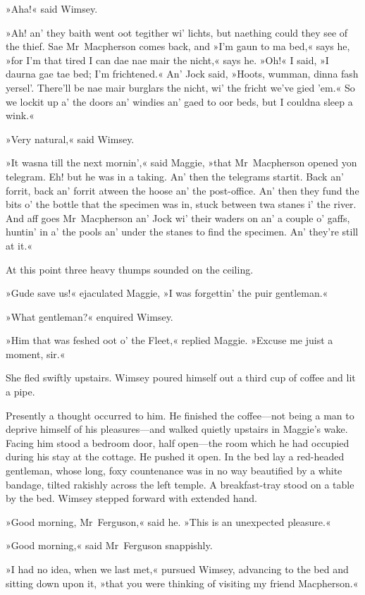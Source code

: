 »Aha!« said Wimsey.

»Ah! an' they baith went oot tegither wi' lichts, but naething could they see of the thief. Sae Mr~Macpherson comes back, and »I'm gaun to ma bed,« says he, »for I'm that tired I can dae nae mair the nicht,« says he. »Oh!« I said, »I daurna gae tae bed; I'm frichtened.« An' Jock said, »Hoots, wumman, dinna fash yersel'. There'll be nae mair burglars the nicht, wi' the fricht we've gied 'em.« So we lockit up a' the doors an' windies an' gaed to oor beds, but I couldna sleep a wink.«

»Very natural,« said Wimsey.

»It wasna till the next mornin',« said Maggie, »that Mr~Macpherson opened yon telegram. Eh! but he was in a taking. An' then the telegrams startit. Back an' forrit, back an' forrit atween the hoose an' the post-office. An' then they fund the bits o' the bottle that the specimen was in, stuck between twa stanes i' the river. And aff goes Mr~Macpherson an' Jock wi' their waders on an' a couple o' gaffs, huntin' in a' the pools an' under the stanes to find the specimen. An' they're still at it.«

At this point three heavy thumps sounded on the ceiling.

»Gude save us!« ejaculated Maggie, »I was forgettin' the puir gentleman.«

»What gentleman?« enquired Wimsey.

»Him that was feshed oot o' the Fleet,« replied Maggie. »Excuse me juist a moment, sir.«

She fled swiftly upstairs. Wimsey poured himself out a third cup of coffee and lit a pipe.

Presently a thought occurred to him. He finished the coffee—not being a man to deprive himself of his pleasures—and walked quietly upstairs in Maggie's wake. Facing him stood a bedroom door, half open—the room which he had occupied during his stay at the cottage. He pushed it open. In the bed lay a red-headed gentleman, whose long, foxy countenance was in no way beautified by a white bandage, tilted rakishly across the left temple. A breakfast-tray stood on a table by the bed. Wimsey stepped forward with extended hand.

»Good morning, Mr~Ferguson,« said he. »This is an unexpected pleasure.«

»Good morning,« said Mr~Ferguson snappishly.

»I had no idea, when we last met,« pursued Wimsey, advancing to the bed and sitting down upon it, »that you were thinking of visiting my friend Macpherson.«

